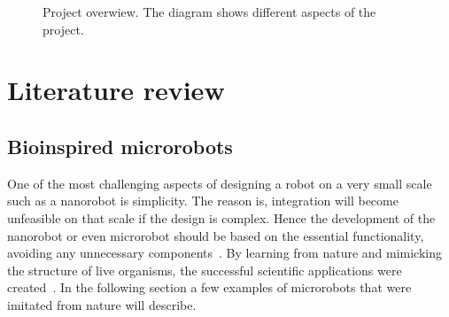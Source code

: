 \documentclass[12pt,a4paper,titlepage]{report}
\begin{document}
\begin{figure}
\centering
\pagestyle{empty}

\caption{Project overwiew. The diagram shows different aspects of the project.  }						   
\label{Overview}										   
\end{figure}





\section{Literature review}
 


\subsection{Bioinspired microrobots}

One of the most challenging aspects of designing a robot on a very small scale such 
as a nanorobot is simplicity. The reason is, integration will become unfeasible on that
 scale if the design is complex. Hence the development of the nanorobot or even microrobot
 should be based on the essential functionality, avoiding any unnecessary components~\citep{gao2013bioinspired}.
By learning from nature and mimicking the structure of live organisms, the successful  
scientific applications were created~\citep{qiunanohelices}. In the following section a
 few examples of microrobots that were imitated from nature will describe. 
 
\end{document}
